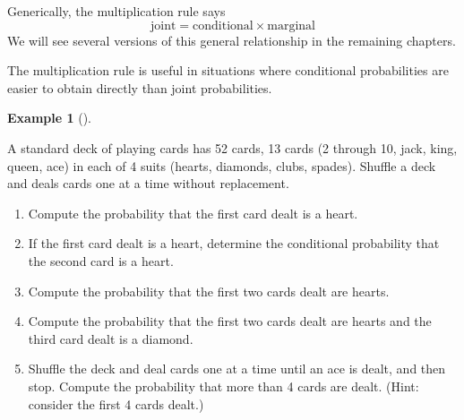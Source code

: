\documentclass[
  letterpaper,
  DIV=11,
  numbers=noendperiod]{scrreprt}
\providecommand{\tightlist}{%
  \setlength{\itemsep}{0pt}\setlength{\parskip}{0pt}}
\theoremstyle{plain}
\theoremstyle{definition}
\newtheorem{example}{Example}[chapter]
\theoremstyle{definition}
\theoremstyle{definition}
\theoremstyle{remark}
\begin{document}
Generically, the multiplication rule says \[
\text{joint} = \text{conditional}\times\text{marginal}
\] We will see several versions of this general relationship in the
remaining chapters.

The multiplication rule is useful in situations where conditional
probabilities are easier to obtain directly than joint probabilities.

\begin{tcolorbox}[enhanced jigsaw, opacityback=0, left=2mm, colframe=quarto-callout-note-color-frame, toprule=.15mm, breakable, colback=white, leftrule=.75mm, arc=.35mm, rightrule=.15mm, bottomrule=.15mm]

\begin{example}[]\protect\hypertarget{exm-card-multiplication-rule}{}\label{exm-card-multiplication-rule}

A standard deck of playing cards has 52 cards, 13 cards (2 through 10,
jack, king, queen, ace) in each of 4 suits (hearts, diamonds, clubs,
spades). Shuffle a deck and deals cards one at a time without
replacement.

\begin{enumerate}
\def\labelenumi{\arabic{enumi}.}
\tightlist
\item
  Compute the probability that the first card dealt is a heart.
\item
  If the first card dealt is a heart, determine the conditional
  probability that the second card is a heart.
\item
  Compute the probability that the first two cards dealt are hearts.
\item
  Compute the probability that the first two cards dealt are hearts and
  the third card dealt is a diamond.
\item
  Shuffle the deck and deal cards one at a time until an ace is dealt,
  and then stop. Compute the probability that more than 4 cards are
  dealt. (Hint: consider the first 4 cards dealt.)
\end{enumerate}

\end{example}

\end{tcolorbox}
\end{document}
